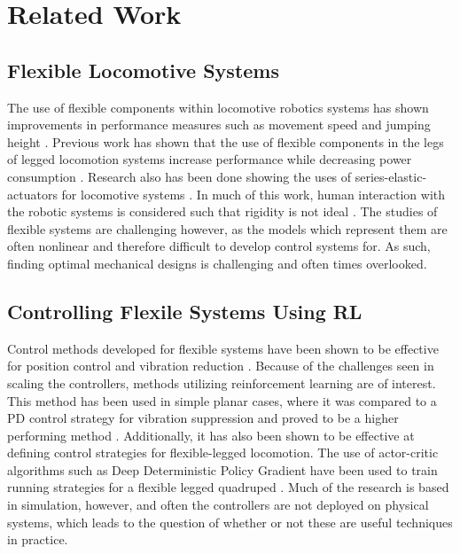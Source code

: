 \documentclass[10pt,twocolumn,letterpaper]{article}
\begin{document}

\section{Related Work}
\label{sec:related_work}
\subsection{Flexible Locomotive Systems}

The use of flexible components within locomotive robotics systems has shown improvements in performance measures such as movement speed and jumping height \cite{Sugiyama2004, Hurst2008}. Previous work has shown that the use of flexible components in the legs of legged locomotion systems increase performance while decreasing power consumption \cite{Saranli2001}. Research also has been done showing the uses of series-elastic-actuators for locomotive systems \cite{Pratt1995}. In much of this work, human interaction with the robotic systems is considered such that rigidity is not ideal \cite{Zhang2019}. The studies of flexible systems are challenging however, as the models which represent them are often nonlinear and therefore difficult to develop control systems for. As such, finding optimal mechanical designs is challenging and often times overlooked. 

\subsection{Controlling Flexile Systems Using RL}

Control methods developed for flexible systems have been shown to be effective for position control and vibration reduction \cite{Luo1993, Ahmadi1997}. Because of the challenges seen in scaling the controllers, methods utilizing reinforcement learning are of interest. This method has been used in simple planar cases, where it was compared to a PD control strategy for vibration suppression and proved to be a higher performing method \cite{He2020f}. Additionally, it has also been shown to be effective at defining control strategies for flexible-legged locomotion. The use of actor-critic algorithms such as Deep Deterministic Policy Gradient \cite{Lillicrap2016h} have been used to train running strategies for a flexible legged quadruped \cite{Dwiel2019d}. Much of the research is based in simulation, however, and often the controllers are not deployed on physical systems, which leads to the question of whether or not these are useful techniques in practice.
\end{document}
